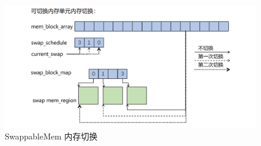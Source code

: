 \begin{figure}[!h]
    \centering
    \includegraphics[width=\linewidth]{figure/paper/swap-mem-swap.png}
    \caption{SwappableMem 内存切换}
    \label{paper:swap-mem-swap}
\end{figure}

